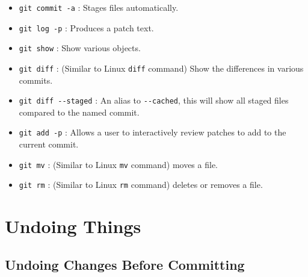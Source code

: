 	\begin{itemize}
		\item \verb|git commit -a| : Stages files automatically.
		
		\item \verb|git log -p| : Produces a patch text.
		
		\item \verb|git show| : Show various objects.
		
 		\item \verb|git diff| : (Similar to Linux \texttt{diff} command) Show the differences in various commits.
 		
		\item \verb|git diff --staged| : An alias to \verb|--cached|, this will show all staged files compared to the named commit.
 		
 		\item \verb|git add -p| : Allows a user to interactively review patches to add to the current commit.
 		
 		\item \verb|git mv| : (Similar to Linux \texttt{mv} command) moves a file.
 		
 		\item \verb|git rm| : (Similar to Linux \texttt{rm} command) deletes or removes a file.
		 
		 
	\end{itemize}

\section{Undoing Things}

	\subsection{Undoing Changes Before Committing}
	
